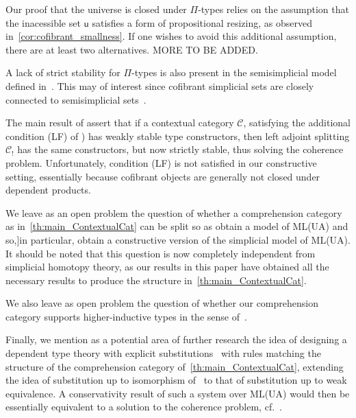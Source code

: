 \documentclass[reqno,10pt,a4paper,oneside,draft]{amsart}
\begin{document}
\begin{remark} \label{rem:strength}
Our proof that the universe is closed under $\Pi$-types relies on the assumption that the inacessible
set $\mathsf{u}$ satisfies a form of propositional resizing, as observed in~\cref{cor:cofibrant_smallness}. If one wishes to avoid this additional assumption, there are at least two alternatives.  MORE TO BE ADDED.
\end{remark}


\begin{remark} A lack of strict stability for $\Pi$-types is also present in the semisimplicial
model defined in~\cite{CoquandT:gentgi}. This may of interest since cofibrant simplicial
sets are closely connected to semisimplicial sets~\cite{henry2019qms}. 
\end{remark} 

\begin{remark}
The main result of \cite{LumsdaineP:locuoc} assert that if a contextual category $\mathcal{C}$, satisfying 
the additional condition  (LF) of \cite[Definition 3.1.3]{LumsdaineP:locuoc}) has weakly stable type constructors, then left adjoint splitting $\mathcal{C}_!$ has the same constructors, but now strictly stable,
thus solving the coherence problem. Unfortunately, condition (LF) is not satisfied in our constructive
setting, essentially because cofibrant objects are generally not closed under dependent products.  
\end{remark}

We leave as an open problem the question of whether a comprehension category as in~\cref{th:main_ContextualCat} can be split so as obtain a model of ML(UA) and so,]in particular,
obtain a constructive version of the simplicial model of ML(UA). It should be noted that this question
is now completely independent from simplicial homotopy theory, as our results in this paper have 
obtained all the necessary results to produce the structure in~\cref{th:main_ContextualCat}. 

We also leave as open problem the question of whether our comprehension category supports
higher-inductive types in the sense of~\cite{hottbook}. 

Finally, we mention as a potential area of further research the idea of designing a dependent type
theory with explicit substitutions~\cite{AbadiM:exps} with rules matching the structure of the comprehension category of~\cref{th:main_ContextualCat}, extending the idea of 
substitution up to isomorphism of~\cite{CurienP:subi} to that of substitution up to weak equivalence. 
A conservativity result of such a system over ML(UA)
would then be essentially equivalent to a solution to the coherence problem, {cf.}~\cite{CurienPL:revcit}.
\end{document}
